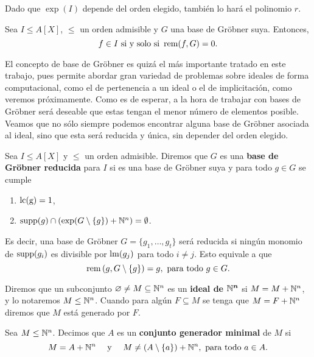 \begin{observacion}
    Dado que $\exp(I)$ depende del orden elegido, también lo hará el polinomio $r$.
\end{observacion}

\begin{corolario}\label{cor:redCero}
    Sea $I\le A[X]$, $\le$ un orden admisible y $G$ una base de Gröbner suya. Entonces,
    $$f\in I \text{ si y solo si } \operatorname{rem}(f,G)=0.$$
\end{corolario}

El concepto de base de Gröbner es quizá el más importante tratado en este trabajo, pues permite abordar gran variedad de problemas sobre ideales de forma computacional, como el de pertenencia a un ideal o el de implicitación, como veremos próximamente. Como es de esperar, a la hora de trabajar con bases de Gröbner será deseable que estas tengan el menor número de elementos posible. Veamos que no sólo siempre podemos encontrar alguna base de Gröbner asociada al ideal, sino que esta será reducida y única, sin depender del orden elegido.

\begin{definicion}
    Sea $I\le A[X]$ y $\le$ un orden admisible. Diremos que $G$ es una \textbf{base de Gröbner reducida} para $I$ si es una base de Gröbner suya y para todo $g\in G$ se cumple
    \begin{enumerate}
        \item $\operatorname{lc(g)}=1$,
        \item $\operatorname{supp}(g) \cap \left(\exp(G\setminus\{g\}) + \mathbb{N}^n \right) = \emptyset$.
    \end{enumerate}
    Es decir, una base de Gröbner $G=\{g_1,\dots, g_t\}$ será reducida si ningún monomio de $\operatorname{supp}(g_i)$ es divisible por $\operatorname{lm}(g_j)$ para todo $i\neq j$. Esto equivale a que
    \begin{equation*}
        \operatorname{rem}\left(g, G\setminus \{g\}\right) = g,\ \text{para todo } g\in G.
    \end{equation*}
\end{definicion}

\begin{definicion}
    Diremos que un subconjunto $\varnothing \neq M \subseteq \mathbb{N}^n$ es un \textbf{ideal de $\boldsymbol{\mathbb{N}^n}$} si $M=M+\mathbb{N}^n$, y lo notaremos $M\le \mathbb{N}^n$. Cuando para algún $F\subseteq M$ se tenga que $M=F+\mathbb{N}^n$ diremos que $M$ está generado por $F$.
\end{definicion}
\begin{definicion}
    Sea $M\le \mathbb{N}^n$. Decimos que $A$ es un \textbf{conjunto generador minimal} de $M$ si
    \begin{equation*}
        M = A + \mathbb{N}^n \quad \text{ y } \quad M\neq (A\setminus \{a\}) + \mathbb{N}^n,\ \text{para todo } a \in A.
    \end{equation*}
\end{definicion}

